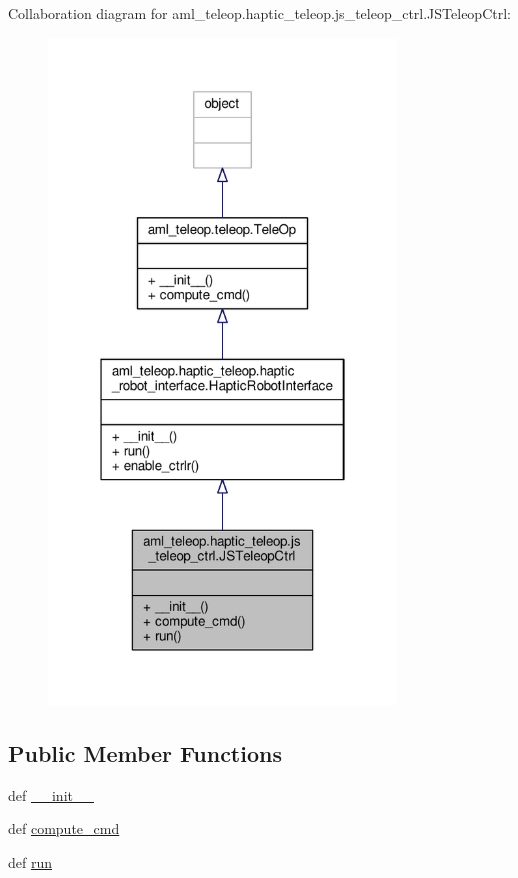 Collaboration diagram for aml\-\_\-teleop.\-haptic\-\_\-teleop.\-js\-\_\-teleop\-\_\-ctrl.\-J\-S\-Teleop\-Ctrl\-:
\nopagebreak
\begin{figure}[H]
\begin{center}
\leavevmode
\includegraphics[width=262pt]{classaml__teleop_1_1haptic__teleop_1_1js__teleop__ctrl_1_1_j_s_teleop_ctrl__coll__graph}
\end{center}
\end{figure}
\subsection*{Public Member Functions}
\begin{DoxyCompactItemize}
\item 
def \hyperlink{classaml__teleop_1_1haptic__teleop_1_1js__teleop__ctrl_1_1_j_s_teleop_ctrl_a93d5c051fbc01517899303e8acccc869}{\-\_\-\-\_\-init\-\_\-\-\_\-}
\item 
def \hyperlink{classaml__teleop_1_1haptic__teleop_1_1js__teleop__ctrl_1_1_j_s_teleop_ctrl_a2eccb0872b1e3f49d77e1ed1889e4565}{compute\-\_\-cmd}
\item 
def \hyperlink{classaml__teleop_1_1haptic__teleop_1_1js__teleop__ctrl_1_1_j_s_teleop_ctrl_a98ba6c0c014f32e056e4a9f3e012710a}{run}
\end{DoxyCompactItemize}


